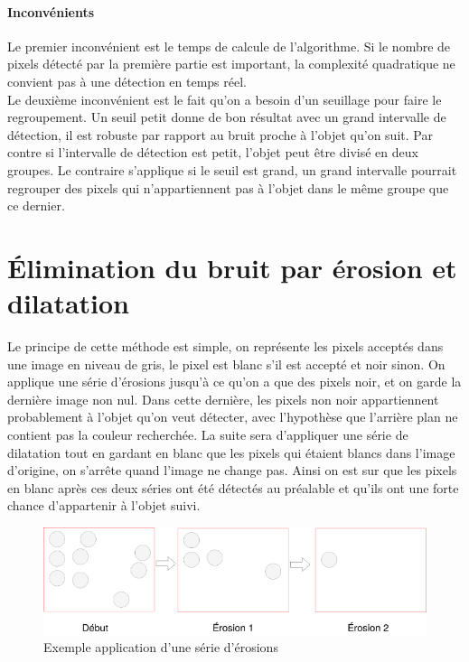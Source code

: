 \documentclass[12pt]{report}
\begin{document}
	\paragraph{Inconvénients}
	
	Le premier inconvénient est le temps de calcule de l’algorithme. Si le nombre de pixels détecté par la première partie est important, la complexité quadratique ne convient pas à une détection en temps réel.\\
	
	Le deuxième inconvénient est le fait qu’on a besoin d’un seuillage pour faire le regroupement. Un seuil petit donne de bon résultat avec un grand intervalle de détection, il est robuste par rapport au bruit proche à l’objet qu’on suit. Par contre si l’intervalle de détection est petit, l’objet peut être divisé en deux groupes. Le contraire s’applique si le seuil est grand, un grand intervalle pourrait regrouper des pixels qui n’appartiennent pas à l’objet dans le même groupe que ce dernier.
	\section{Élimination du bruit par érosion et dilatation}
	Le principe de cette méthode est simple, on représente les pixels acceptés dans une image en niveau de gris, le pixel est blanc s’il est accepté et noir sinon. On applique une série d’érosions jusqu’à ce qu’on a que des pixels noir, et on garde la dernière image non nul. Dans cette dernière, les pixels non noir appartiennent probablement à l’objet qu’on veut détecter, avec l’hypothèse que l’arrière plan ne contient pas la couleur recherchée. La suite sera d’appliquer une série de dilatation tout en gardant en blanc que les pixels qui étaient blancs dans l’image d’origine, on s’arrête quand l’image ne change pas. Ainsi on est sur que les pixels en blanc après ces deux séries ont été détectés au préalable et qu’ils ont une forte chance d’appartenir à l’objet suivi.
	\begin{figure}[H]
		\centering
		\includegraphics[scale=0.75]{imgs/erosions1.png}
		\caption{Exemple application d'une série d'érosions}
		\label{fig:Erosions}
	\end{figure}
	
\end{document}

